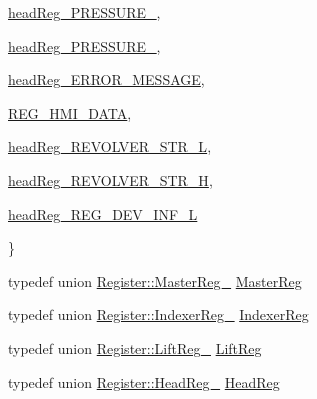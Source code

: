 \begin{DoxyCompactItemize}
\begin{DoxyCompactItemize}
\item\mbox{\hyperlink{classRegister_ac62b4973b5619eb86226477da8f02599a4326f55487f62bc2964dcb14051f727f}{head\+Reg\+\_\+\+P\+R\+E\+S\+S\+U\+R\+E\+\_}}, 
\item\mbox{\hyperlink{classRegister_ac62b4973b5619eb86226477da8f02599a0614606ddad412e42910af65be60e95e}{head\+Reg\+\_\+\+P\+R\+E\+S\+S\+U\+R\+E\+\_}}, 
\item\mbox{\hyperlink{classRegister_ac62b4973b5619eb86226477da8f02599a87031dac6412c38fd6bec4c6ca0b2217}{head\+Reg\+\_\+\+E\+R\+R\+O\+R\+\_\+\+M\+E\+S\+S\+A\+GE}}, 
\item\mbox{\hyperlink{classRegister_ac62b4973b5619eb86226477da8f02599a57a69916986f8912e92f5c9d3875dc95}{R\+E\+G\+\_\+\+H\+M\+I\+\_\+\+D\+A\+TA}}, 
\item\mbox{\hyperlink{classRegister_ac62b4973b5619eb86226477da8f02599a53cfdc3c4ac4cdb2226dd1b2c4feaf68}{head\+Reg\+\_\+\+R\+E\+V\+O\+L\+V\+E\+R\+\_\+\+S\+T\+R\+\_\+L}}, 
\item\mbox{\hyperlink{classRegister_ac62b4973b5619eb86226477da8f02599aa75320131e30db8da97727146dc43bea}{head\+Reg\+\_\+\+R\+E\+V\+O\+L\+V\+E\+R\+\_\+\+S\+T\+R\+\_\+H}}, 
\item\mbox{\hyperlink{classRegister_ac62b4973b5619eb86226477da8f02599afa1d6f57952d709b84c2b9bd44c65b79}{head\+Reg\+\_\+\+R\+E\+G\+\_\+\+D\+E\+V\+\_\+\+I\+N\+F\+\_\+L}}
\end{DoxyCompactItemize}
 \}
\item 
typedef union \mbox{\hyperlink{unionRegister_1_1MasterReg__}{Register\+::\+Master\+Reg\+\_\+}} \mbox{\hyperlink{classRegister_a630b191556a3f41212c05692cde34bb6}{Master\+Reg}}
\item 
typedef union \mbox{\hyperlink{unionRegister_1_1IndexerReg__}{Register\+::\+Indexer\+Reg\+\_\+}} \mbox{\hyperlink{classRegister_ae3e4e798be262566081377b4a056b86f}{Indexer\+Reg}}
\item 
typedef union \mbox{\hyperlink{unionRegister_1_1LiftReg__}{Register\+::\+Lift\+Reg\+\_\+}} \mbox{\hyperlink{classRegister_a565ad47577d69936817417bdb0a3369f}{Lift\+Reg}}
\item 
typedef union \mbox{\hyperlink{unionRegister_1_1HeadReg__}{Register\+::\+Head\+Reg\+\_\+}} \mbox{\hyperlink{classRegister_aedd78617c89acc840bea50ffba355f24}{Head\+Reg}}
\end{DoxyCompactItemize}
